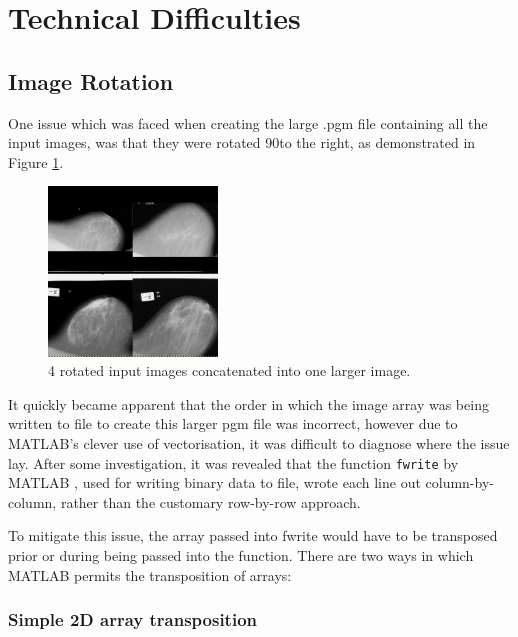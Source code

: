 \section{Technical Difficulties}
\label{sec:tech-diff}

\subsection{Image Rotation}
\label{ssec:trans}

One issue which was faced when creating the large .pgm file containing all the input images, was that they were rotated 90\degree to the right, as demonstrated in Figure \ref{fig:rotated-input}.

\begin{figure}[H]
  \centering
  \includegraphics[width=0.4\textwidth]{Chapter2/technical-img/rotation.png}
  \caption{4 rotated input images concatenated into one larger image.}
  \label{fig:rotated-input}
\end{figure}

It quickly became apparent that the order in which the image array was being written to file to create this larger pgm file was incorrect, however due to MATLAB's clever use of vectorisation, it was difficult to diagnose where the issue lay. After some investigation, it was revealed that the function \texttt{fwrite} by MATLAB \cite{fwrite}, used for writing binary data to file, wrote each line out column-by-column, rather than the customary row-by-row approach.

To mitigate this issue, the array passed into fwrite would have to be transposed prior or during being passed into the function. There are two ways in which MATLAB permits the \gls{transposition} of arrays:

\subsubsection{Simple 2D array transposition}

